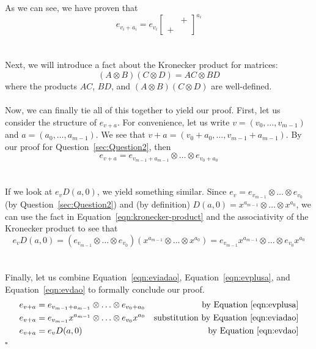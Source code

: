 \documentclass[letterpaper]{article}
\newcommand*{\QED}{\hfill\ensuremath{\square}}%
\begin{document}
As we can see, we have proven that
\begin{equation}
    \label{eqn:eviadao}
    e_{v_{i} + a_{i}} = e_{v_{i}} \begin{bmatrix} & + \\ + & \end{bmatrix}^{a_{i}}
\end{equation}
\\ \\
Next, we will introduce a fact about the Kronecker product for matrices:
\begin{equation}
(A \otimes B) (C \otimes D) = AC \otimes BD
\label{eqn:kronecker-product}
\end{equation}
where the products $ AC $, $ BD $, and $ (A \otimes B) (C \otimes D) $ are well-defined.
\\ \\
Now, we can finally tie all of this together to yield our proof.
First, let us consider the structure of $ e_{v + a} $.
For convenience, let us write $ v = (v_0, \ldots, v_{m - 1}) $ and $ a = (a_0, \ldots, a_{m - 1}) $.
We see that $ v + a = (v_0 + a_0, \ldots, v_{m - 1} + a_{m - 1}) $.
By our proof for Question~\ref{sec:Question2}, then
\begin{equation}
    \label{eqn:evplusa}
e_{v + a} = e_{v_{m - 1} + a_{m - 1}} \otimes \ldots \otimes e_{v_0 + a_0}
\end{equation}
\\ \\
If we look at $ e_v D(a, 0) $, we yield something similar.
Since $ e_v = e_{v_{m - 1}} \otimes \ldots \otimes e_{v_0} $ (by Question~\ref{sec:Question2}) and (by definition) $ D(a, 0) = x^{a_{m - 1}} \otimes \ldots \otimes x^{a_{0}} $, we can use the fact in Equation~\ref{eqn:kronecker-product} and the associativity of the Kronecker product to see that
\begin{equation}
    \label{eqn:evdao}
    e_v D(a, 0) = (e_{v_{m - 1}} \otimes \ldots \otimes e_{v_0})(x^{a_{m - 1}} \otimes \ldots \otimes x^{a_{0}}) = e_{v_{m - 1}} x^{a_{m - 1}} \otimes \ldots \otimes e_{v_0} x^{a_{0}}
\end{equation}
\\ \\
Finally, let us combine Equation~\ref{eqn:eviadao}, Equation~\ref{eqn:evplusa}, and Equation~\ref{eqn:evdao} to formally conclude our proof.
\begin{align*}
    e_{v + a} &= e_{v_{m - 1} + a_{m - 1}} \otimes \ldots \otimes e_{v_0 + a_0} &\text{by Equation~\ref{eqn:evplusa}} \\
    e_{v + a} &= e_{v_{m - 1}} x^{a_{m - 1}} \otimes \ldots \otimes e_{v_0} x^{a_{0}} &\text{substitution by Equation~\ref{eqn:eviadao}} \\
    e_{v + a} &= e_v D(a, 0) &\text{by Equation~\ref{eqn:evdao}}
\end{align*}
\QED{}
\end{document}
